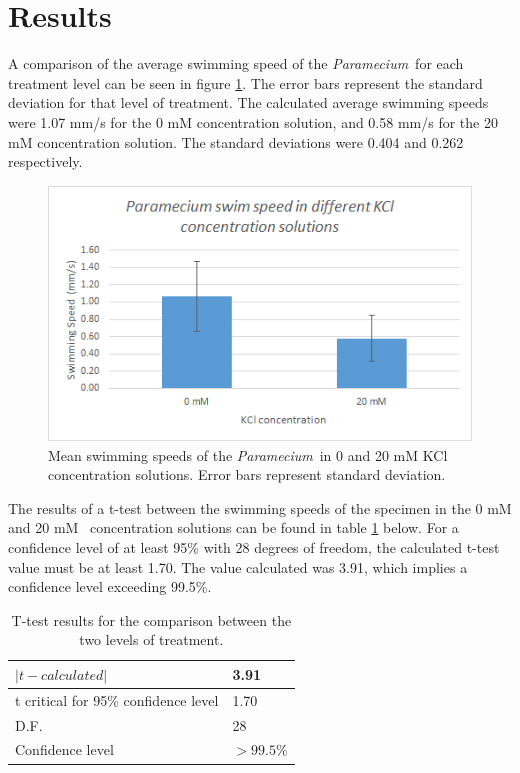 \documentclass[12pt]{article}
\newcommand{\p}{\textit{Paramecium}}
\newcommand{\kcl}{\ce{KCl}}
\begin{document}
\section{Results}
	A comparison of the average swimming speed of the \p\ for each treatment level can be seen in figure \ref{barGraph}. The error bars represent the standard deviation for that level of treatment. The calculated average swimming speeds were 1.07 mm/s for the 0 mM concentration solution, and 0.58 mm/s for the 20 mM concentration solution. The standard deviations were 0.404 and 0.262 respectively. \newpage
	\begin{figure}[t]
		\centering
		\includegraphics{chart1.png}
		\caption{Mean swimming speeds of the \p\ in 0 and 20 mM KCl concentration solutions. Error bars represent standard deviation.}
		\label{barGraph}
	\end{figure} 
	
	The results of a t-test between the swimming speeds of the specimen in the 0 mM and 20 mM \kcl\ concentration solutions can be found in table \ref{t-test} below. For a confidence level of at least 95\% with 28 degrees of freedom, the calculated t-test value must be at least 1.70. The value calculated was 3.91, which implies a confidence level exceeding 99.5\%.\\
	
	\begin{table}[h]
		\centering
		\begin{tabular}{|l|l|} \hline
			$|t-calculated|$ & 3.91 \\ \hline
			t critical for 95\% confidence level & 1.70 \\ \hline
			D.F. & 28 \\ \hline
			Confidence level & $>99.5\%$ \\ \hline
		\end{tabular}
		\caption{T-test results for the comparison between the two levels of treatment.}
		\label{t-test}
	\end{table}
	
\end{document}
